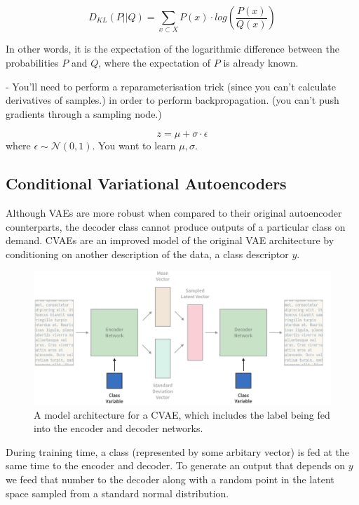 \documentclass[12pt,twoside]{report}
\begin{document}
$$
D_{KL}(P ||Q) = \sum_{x \subset X} P(x) \cdot log (\frac{P(x)}{Q(x)})
$$

In other words, it is the expectation of the logarithmic difference between the probabilities $P$ and $Q$, where the expectation of $P$ is already known.

- You'll need to perform a reparameterisation trick (since you can't calculate derivatives of samples.) in order to perform backpropagation. (you can't push gradients through a sampling node.)
  
$$z = \mu + \sigma \cdot \epsilon $$ where $\epsilon \sim \mathcal{N}(0,1)$. You want to learn $\mu, \sigma$.


\subsection{Conditional Variational Autoencoders}

Although VAEs are more robust when compared to their original autoencoder counterparts, the decoder class cannot produce outputs of a particular class on demand. CVAEs are an improved model of the original VAE architecture by conditioning on another description of the data, a class descriptor $y$. 

\begin{figure}[!ht]
      
	\centering
	\includegraphics[width=150mm]{diagrams/conditional_variational_autoencoders.pdf}
	\caption{A model architecture for a CVAE, which includes the label being fed into the encoder and decoder networks. \label{cvae_diagram}}
  \end{figure}

During training time, a class (represented by some arbitary vector) is fed at the same time to the encoder and decoder. To generate an output that depends on $y$ we feed that number to the decoder along with a random point in the latent space sampled from a standard normal distribution.
\end{document}
